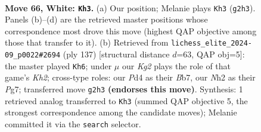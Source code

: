 \documentclass[11pt]{article}
\begin{document}
\clearpage

\begin{figure}[p]\centering
\begin{subfigure}{0.46\textwidth}\centering
\resizebox{\linewidth}{!}{%
\newchessgame
\chessboard[
  setfen={5r1r/p5p1/4Q2p/1k1p3P/p2P2P1/4P3/q5KN/4b3 w - - 40 66},
  showmover=false,
  pgfstyle=straightmove, color=movearrow, markmove={g2-h3}
]}
\caption{}
\end{subfigure}\hfill
\begin{subfigure}{0.46\textwidth}\centering
\resizebox{\linewidth}{!}{%
\newchessgame
\chessboard[
  setfen={8/1b4pk/4p3/1pP1P1pP/1P3qP1/6R1/7K/4Q3 b - - 5 69},
  showmover=false,
  pgfstyle=straightmove, color=movearrow, markmove={h7-h6}
]}
\caption{}
\end{subfigure}
\\[4pt]

\caption{\textbf{Move 66, White: \texttt{Kh3}.} (a) Our position; Melanie plays \texttt{Kh3} (\texttt{g2h3}). Panels (b)--(d) are the retrieved master positions whose correspondence most drove this move (highest QAP objective among those that transfer to it). (b) Retrieved from \texttt{lichess\_elite\_2024-09\_p0022\#2694} (ply 137) [structural distance $d$=63, QAP obj=5]: the master played \texttt{Kh6}; under $\mu$ our \emph{Kg2} plays the role of that game's \emph{Kh2}; cross-type roles: our \emph{P}d4 as their \emph{B}b7, our \emph{N}h2 as their \emph{P}g7; transferred move \texttt{g2h3} \textbf{(endorses this move)}. Synthesis: 1 retrieved analog transferred to \texttt{Kh3} (summed QAP objective 5, the strongest correspondence among the candidate moves); Melanie committed it via the \texttt{search} selector.}
\label{fig:thought-m130}
\end{figure}

\clearpage
\end{document}
